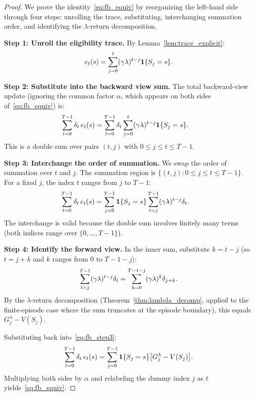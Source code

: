 \documentclass[11pt,a4paper]{article}
\begin{document}
\begin{proof}
We prove the identity~\eqref{eq:fb_equiv} by reorganizing the
left-hand side through four steps: unrolling the trace, substituting,
interchanging summation order, and identifying the $\lambda$-return
decomposition.

\textbf{Step 1: Unroll the eligibility trace.}
By Lemma~\ref{lem:trace_explicit}:
\begin{equation}
  e_t(s) = \sum_{j=0}^{t} (\gamma\lambda)^{t-j}
  \mathbf{1}\{S_j = s\}.
  \label{eq:fb_step1}
\end{equation}

\textbf{Step 2: Substitute into the backward view sum.}
The total backward-view update (ignoring the common factor $\alpha$,
which appears on both sides of~\eqref{eq:fb_equiv}) is:
\begin{align}
  \sum_{t=0}^{T-1} \delta_t\,e_t(s)
  &= \sum_{t=0}^{T-1} \delta_t
     \sum_{j=0}^{t} (\gamma\lambda)^{t-j}
     \mathbf{1}\{S_j = s\}.
  \label{eq:fb_step2}
\end{align}
This is a double sum over pairs $(t, j)$ with
$0 \leq j \leq t \leq T - 1$.

\textbf{Step 3: Interchange the order of summation.}
We swap the order of summation over $t$ and $j$. The summation region
is $\{(t,j) : 0 \leq j \leq t \leq T - 1\}$. For a fixed $j$, the
index $t$ ranges from $j$ to $T - 1$:
\begin{align}
  \sum_{t=0}^{T-1} \delta_t\,e_t(s)
  &= \sum_{j=0}^{T-1} \mathbf{1}\{S_j = s\}
     \sum_{t=j}^{T-1} (\gamma\lambda)^{t-j} \delta_t.
  \label{eq:fb_step3}
\end{align}
The interchange is valid because the double sum involves finitely many
terms (both indices range over $\{0, \ldots, T-1\}$).

\textbf{Step 4: Identify the forward view.}
In the inner sum, substitute $k = t - j$ (so $t = j + k$ and $k$
ranges from $0$ to $T - 1 - j$):
\begin{equation}
  \sum_{t=j}^{T-1} (\gamma\lambda)^{t-j} \delta_t
  = \sum_{k=0}^{T-1-j} (\gamma\lambda)^k \delta_{j+k}.
  \label{eq:fb_step4}
\end{equation}
By the $\lambda$-return decomposition
(Theorem~\ref{thm:lambda_decomp}, applied to the finite-episode
case where the sum truncates at the episode boundary), this equals
$G_j^\lambda - V(S_j)$.

Substituting back into~\eqref{eq:fb_step3}:
\begin{equation}
  \sum_{t=0}^{T-1} \delta_t\,e_t(s)
  = \sum_{j=0}^{T-1} \mathbf{1}\{S_j = s\}
    \bigl[G_j^\lambda - V(S_j)\bigr].
  \label{eq:fb_final}
\end{equation}
Multiplying both sides by $\alpha$ and relabeling the dummy index
$j$ as $t$ yields~\eqref{eq:fb_equiv}.
\end{proof}
\end{document}
